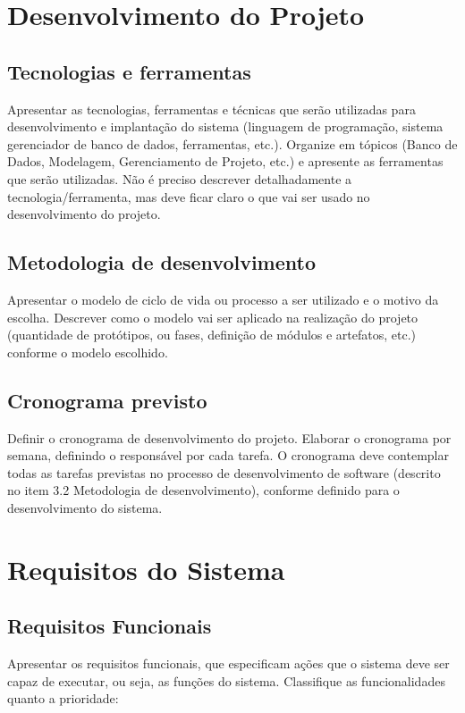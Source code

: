 \documentclass[a4paper,12pt]{article}
\begin{document}
\newpage
\section{Desenvolvimento do Projeto}
\subsection{Tecnologias e ferramentas}

Apresentar as tecnologias, ferramentas e técnicas que serão utilizadas para desenvolvimento e implantação do sistema (linguagem de programação, sistema gerenciador de banco de dados, ferramentas, etc.). Organize em tópicos (Banco de Dados, Modelagem, Gerenciamento de Projeto, etc.) e apresente as ferramentas que serão utilizadas. Não é preciso descrever detalhadamente a tecnologia/ferramenta, mas deve ficar claro o que vai ser usado no desenvolvimento do projeto.

\subsection{Metodologia de desenvolvimento}
Apresentar o modelo de ciclo de vida ou processo a ser utilizado e o motivo da escolha. Descrever como o modelo vai ser aplicado na realização do projeto (quantidade de protótipos, ou fases, definição de módulos e artefatos, etc.) conforme o modelo escolhido.

\subsection{Cronograma previsto}
Definir o cronograma de desenvolvimento do projeto. Elaborar o cronograma por semana, definindo o responsável por cada tarefa. O cronograma deve contemplar todas as tarefas previstas no processo de desenvolvimento de software (descrito no item 3.2 Metodologia de desenvolvimento), conforme definido para o desenvolvimento do sistema.

\newpage
\section{Requisitos do Sistema}
\subsection{Requisitos Funcionais}

Apresentar os requisitos funcionais, que especificam ações que o sistema deve ser capaz de executar, ou seja, as funções do sistema. Classifique as funcionalidades quanto a prioridade:
\end{document}
